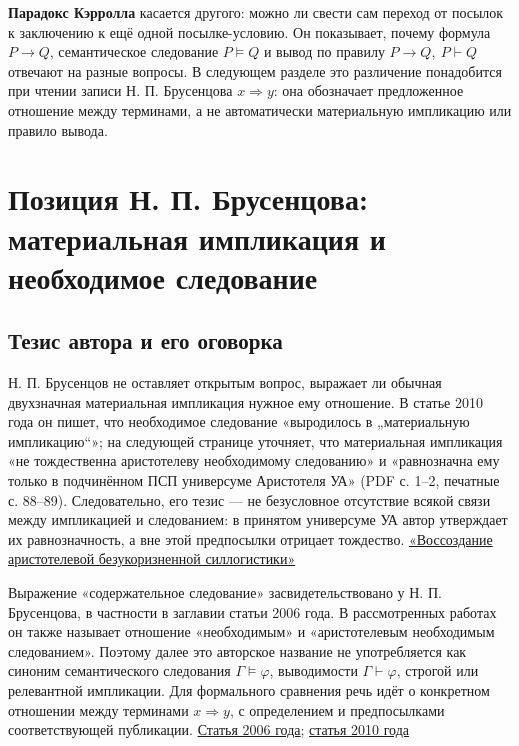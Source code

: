 \documentclass[12pt,a4paper]{article}
\begin{document}
\textbf{Парадокс Кэрролла} касается другого: можно ли свести сам переход от посылок к заключению к ещё одной посылке-условию. Он показывает, почему формула \(P\to Q\), семантическое следование \(P\models Q\) и вывод по правилу \(P\to Q,\ P\vdash Q\) отвечают на разные вопросы. В следующем разделе это различение понадобится при чтении записи Н. П. Брусенцова \(x\Rightarrow y\): она обозначает предложенное отношение между терминами, а не автоматически материальную импликацию или правило вывода.

\section{Позиция Н. П. Брусенцова: материальная импликация и необходимое следование}

\subsection{Тезис автора и его оговорка}

Н. П. Брусенцов не оставляет открытым вопрос, выражает ли обычная двухзначная материальная импликация нужное ему отношение. В статье 2010 года он пишет, что необходимое следование «выродилось в „материальную импликацию“»; на следующей странице уточняет, что материальная импликация «не тождественна аристотелеву необходимому следованию» и «равнозначна ему только в подчинённом ПСП универсуме Аристотеля УА» (PDF с. 1–2, печатные с. 88–89). Следовательно, его тезис — не безусловное отсутствие всякой связи между импликацией и следованием: в принятом универсуме УА автор утверждает их равнозначность, а вне этой предпосылки отрицает тождество. \href{https://ternarycomp.cs.msu.ru/Papers/brusentsov_sborn2010_2.pdf}{«Воссоздание аристотелевой безукоризненной силлогистики»}

Выражение «содержательное следование» засвидетельствовано у Н. П. Брусенцова, в частности в заглавии статьи 2006 года. В рассмотренных работах он также называет отношение «необходимым» и «аристотелевым необходимым следованием». Поэтому далее это авторское название не употребляется как синоним семантического следования \(\Gamma\models\varphi\), выводимости \(\Gamma\vdash\varphi\), строгой или релевантной импликации. Для формального сравнения речь идёт о конкретном отношении между терминами \(x\Rightarrow y\), с определением и предпосылками соответствующей публикации. \href{https://ternarycomp.cs.msu.ru/Papers/Soder_sled.pdf}{Статья 2006 года}; \href{https://ternarycomp.cs.msu.ru/Papers/brusentsov_sborn2010_2.pdf}{статья 2010 года}
\end{document}
